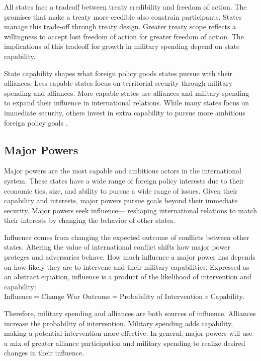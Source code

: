 \documentclass[12pt]{article}
\begin{document}
All states face a tradeoff between treaty credibility and freedom of action. 
The promises that make a treaty more credible also constrain participants. 
States manage this trade-off through treaty design. 
Greater treaty scope reflects a willingness to accept lost freedom of action for greater freedom of action. 
The implications of this tradeoff for growth in military spending depend on state capability. 


State capability shapes what foreign policy goods states pursue with their alliances. 
Less capable states focus on territorial security through military spending and alliances. 
More capable states use alliances and military spending to expand their influence in international relations. 
While many states focus on immediate security, others invest in extra capability to pursue more ambitious foreign policy goals \citep{Fordham2011, MarkowitzFariss2017}. 


\subsection{Major Powers} 


Major powers are the most capable and ambitious actors in the international system. 
These states have a wide range of foreign policy interests due to their economic ties, size, and ability to pursue a wide range of issues. 
Given their capability and interests, major powers pursue goals beyond their immediate security. 
Major powers seek influence--- reshaping international relations to match their interests by changing the behavior of other states. 


Influence comes from changing the expected outcome of conflicts between other states.
Altering the value of international conflict shifts how major power proteges and adversaries behave.  
How much influence a major power has depends on how likely they are to intervene and their military capabilities. 
Expressed as an abstract equation, influence is a product of the likelihood of intervention and capability: $\mbox{Influence} = \mbox{Change War Outcome} = \mbox{Probability of Intervention} \times \mbox{Capability}$.


Therefore, military spending and alliances are both sources of influence. 
Alliances increase the probability of intervention. 
Military spending adds capability, making a potential intervention more effective. 
In general, major powers will use a mix of greater alliance participation and military spending to realize desired changes in their influence. 
\end{document}
